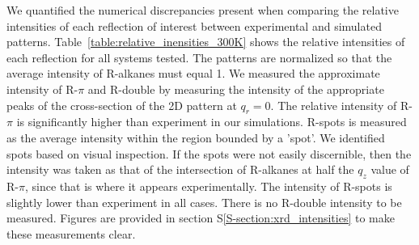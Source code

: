 \documentclass[journal=jpcbfk,manusciprt=article]{achemso}
\begin{document}
  We quantified the numerical discrepancies present when comparing the relative intensities
  of each reflection of interest between experimental and simulated patterns. 
  Table~\ref{table:relative_inensities_300K} shows the relative intensities of each reflection for 
  all systems tested. The patterns are normalized so that the average intensity of R-alkanes 
  must equal 1. We measured the approximate intensity of R-$\pi$ and R-double by measuring the
  intensity of the appropriate peaks of the cross-section of the 2D pattern at $q_r=0$. The 
  relative intensity of R-$\pi$ is significantly higher than experiment in our simulations. 
  R-spots is measured as the average intensity within the region bounded by a 'spot'. We 
  identified spots based on visual inspection. If the spots were not easily discernible, then the 
  intensity was taken as that of the intersection of R-alkanes at half the $q_z$ value of
  R-$\pi$, since that is where it appears experimentally. The intensity of R-spots is slightly
  lower than experiment in all cases. There is no R-double intensity to be measured. Figures
  are provided in section S\ref{S-section:xrd_intensities} to make these measurements clear.
\end{document}
